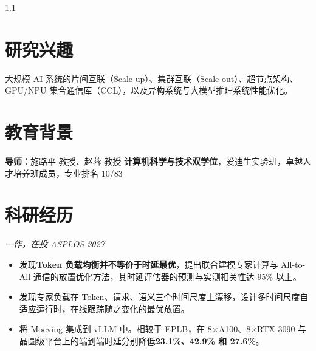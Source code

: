 \documentclass{resume}
\begin{document}
	
	
	
	\begin{spacing}{1.1}
		
		\section{研究兴趣}
		大规模 AI 系统的片间互联（Scale-up）、集群互联（Scale-out）、超节点架构、GPU/NPU 集合通信库（CCL），以及异构系统与大模型推理系统性能优化。
		
		
		
		\section{教育背景}
		\textbf{导师}：施路平 教授、赵蓉 教授
		\textbf{计算机科学与技术双学位}，爱迪生实验班，卓越人才培养班成员，专业排名 10/83
		
		\section{科研经历}
		
		\textit{一作，在投 ASPLOS 2027}
		\begin{itemize}
			\item 发现\textbf{Token 负载均衡并不等价于时延最优}，提出联合建模专家计算与 All-to-All 通信的放置优化方法，其时延评估器的预测与实测相关性达 95\% 以上。
			\item 发现专家负载在 Token、请求、语义三个时间尺度上漂移，设计多时间尺度自适应运行时，在线跟踪随之变化的最优放置。
			\item 将 Moeving 集成到 vLLM 中。相较于 EPLB，在 8×A100、8×RTX 3090 与晶圆级平台上的端到端时延分别降低\textbf{23.1\%、42.9\% 和 27.6\%}。
		\end{itemize}


\end{spacing}
\end{document}
